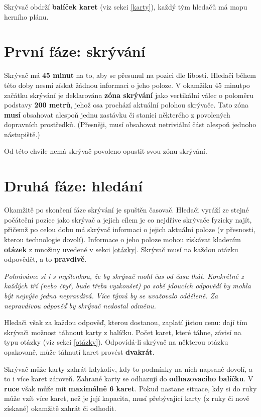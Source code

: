 \documentclass{book}
\newenvironment{reasoning}{\begin{small}\itshape}{\end{small}}
\def\timehiding{45 minut}
\def\hidingzoneradius{200 metrů}
\begin{document}
Skrývač obdrží \textbf{balíček karet} (viz sekci \ref{karty}), každý tým hledačů má mapu herního plánu.

\section{První fáze: skrývání}

Skrývač má \textbf{\timehiding} na to, aby se přesunul na pozici dle libosti. Hledači během této doby nesmí získat žádnou informaci o jeho poloze. V okamžiku \timehiding po začátku skrývání je deklarována \textbf{zóna skrývání} jako vertikální válec o poloměru podstavy \textbf{\hidingzoneradius}, jehož osa prochází aktuální polohou skrývače. Tato zóna \textbf{musí} obsahovat alespoň jednu zastávku či stanici některého z povolených dopravních prostředků. (Přesněji, musí obsahovat netriviální část alespoň jednoho nástupiště.)

Od této chvíle nemá skrývač povoleno opustit svou zónu skrývání.

\section{Druhá fáze: hledání}

Okamžitě po skončení fáze skrývání je spuštěn časovač. Hledači vyráží ze stejné počáteční pozice jako skrývač a jejich cílem je co nejdříve skrývače fyzicky najít, přičemž po celou dobu má skrývač informaci o jejich aktuální poloze (v přesnosti, kterou technologie dovolí). Informace o jeho poloze mohou získávat kladením \textbf{otázek} z množiny uvedené v sekci \ref{otázky}. Skrývač musí na každou otázku odpovědět, a to \textbf{pravdivě}.

\begin{reasoning}
	Pohráváme si i s myšlenkou, že by skrývač mohl čas od času lhát. Konkrétně z každých tří (nebo čtyř, bude třeba vyzkoušet) po sobě jdoucích odpovědí by mohla být nejvýše jedna nepravdivá. Více týmů by se uvažovalo odděleně. Za nepravdivou odpověď by skrývač nedostal odměnu.
\end{reasoning}

Hledači však za každou odpověď, kterou dostanou, zaplatí jistou cenu: dají tím skrývači možnost táhnout karty z balíčku. Počet karet, které táhne, závisí na typu otázky (viz sekci \ref{otázky}). Odpovídá-li skrývač na některou otázku opakovaně, může táhnutí karet provést \textbf{dvakrát}.

Skrývač může karty zahrát kdykoliv, kdy to podmínky na nich napsané dovolí, a to i více karet zároveň. Zahrané karty se odhazují do \textbf{odhazovacího balíčku}. V \textbf{ruce} však může mít \textbf{maximálně 6 karet}. Pokud nastane situace, kdy si do ruky může vzít více karet, než je její kapacita, musí přebývající karty (z ruky či nově získané) okamžitě zahrát či odhodit.
\end{document}
